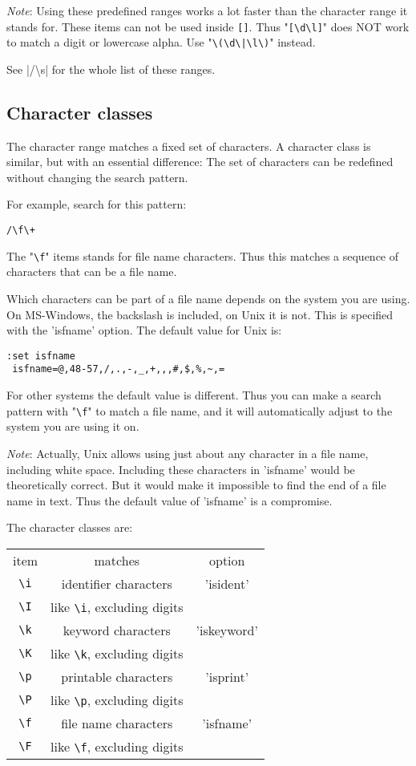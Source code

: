 \emph{Note}:
Using these predefined ranges works a lot faster than the character range it stands for.
These items can not be used inside \verb![]!.
Thus "\verb![\d\l]!" does NOT work to match a digit or lowercase alpha.
Use "\verb!\(\d\|\l\)!" instead.

See |/\textbackslash s| for the whole list of these ranges.
\subsection{Character classes}
The character range matches a fixed set of characters.
A character class is similar, but with an essential difference: The set of characters can be redefined without changing the search pattern.

For example, search for this pattern:

\begin{Verbatim}[samepage=true]
 /\f\+
\end{Verbatim}

The "\verb!\f!" items stands for file name characters.
Thus this matches a sequence of characters that can be a file name.

Which characters can be part of a file name depends on the system you are using.
On MS-Windows, the backslash is included, on Unix it is not.
This is specified with the 'isfname' option.
The default value for Unix is:

\begin{Verbatim}[samepage=true]
 :set isfname
 isfname=@,48-57,/,.,-,_,+,,,#,$,%,~,=
\end{Verbatim}

For other systems the default value is different.
Thus you can make a search pattern with "\verb!\f!" to match a file name, and it will automatically adjust to the system you are using it on.

\emph{Note}: Actually, Unix allows using just about any character in a file name, including white space.
Including these characters in 'isfname' would be theoretically correct.
But it would make it impossible to find the end of a file name in text.
Thus the default value of 'isfname' is a compromise.

The character classes are:

\begin{center} \begin{tabular}{c c c}
				item & matches & option \\
				\verb!\i! & identifier characters & 'isident' \\
				\verb!\I! & like \verb!\i!, excluding digits & \\
				\verb!\k! & keyword characters & 'iskeyword' \\
				\verb!\K! & like \verb!\k!, excluding digits & \\
				\verb!\p! & printable characters & 'isprint' \\
				\verb!\P! & like \verb!\p!, excluding digits & \\
				\verb!\f! & file name characters & 'isfname' \\
				\verb!\F! & like \verb!\f!, excluding digits & \\
\end{tabular} \end{center}
